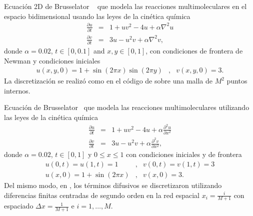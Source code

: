 \begin{example}\label{ex:Brus2D}
    Ecuación 2D de Brusselator ~\cite{lefever1971chemical,tokman2012new} que modela las reacciones multimoleculares en el espacio bidimensional usando las leyes de la cinética química
    \begin{eqnarray*}
        \frac{\partial u}{\partial t} &=&1+uv^{2}-4u+\alpha \nabla^{2}u\\
        \frac{\partial v}{\partial t}&=&3u-u^{2}v+\alpha \nabla^{2}v,
    \end{eqnarray*}
    donde $\alpha = 0\mathord{.}02$, $t\in[0, 0\mathord{.}1]$ and $x,y\in[0,1]$,
    con condiciones de frontera de Newman y condiciones iniciales
    \begin{eqnarray*}
        u(x,y,0)=1+\sin(2\pi x)\sin(2\pi y) &,& v(x,y,0)=3.
    \end{eqnarray*}
    La discretización se realizó como en el código de \cite{jansing2011expode} sobre una malla de $M^2$ puntos internos.
\end{example}

\begin{example}\label{ex:Brus}
    Ecuación de Brusselator~\cite{lefever1971chemical,tokman2006efficient} que modela las reacciones multimoleculares utilizando las leyes de la cinética química
    \begin{eqnarray*}
        \frac{\partial u}{\partial t}&=&1+uv^{2}-4u+\alpha \frac{\partial ^{2}u}{\partial x^{2}}\\
        \frac{\partial v}{\partial t}&=&3u-u^{2}v+\alpha \frac{\partial ^{2}v}{\partial x^{2}},
    \end{eqnarray*}
    donde $\alpha = 0\mathord{.}02$, $t\in [0,1]$ y $0\leq x \leq 1$ con condiciones iniciales y de frontera
    \begin{eqnarray*}
        u(0,t)=u(1,t)=1 &,& v(0,t)=v(1,t)=3\\
        u(x,0)=1+\sin(2\pi x) &,& v(x,0)=3 .
    \end{eqnarray*}
    Del mismo modo, en \cite{tokman2006efficient}, los términos difusivos se discretizaron utilizando diferencias finitas centradas de segundo orden en la red espacial $x_i=\frac{i}{M+1}$ con espaciado  $\Delta x = \frac{1}{M+1}$ e $i=1,\ldots,M$.
\end{example}

